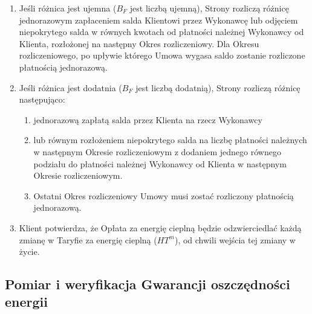 \begin{enumerate}
	\item Jeśli różnica jest ujemna ($B_F$ jest liczbą ujemną), Strony rozliczą różnicę jednorazowym zapłaceniem salda Klientowi przez Wykonawcę lub odjęciem niepokrytego salda w równych kwotach od płatności należnej Wykonawcy od Klienta, rozłożonej na następny Okres rozliczeniowy. Dla Okresu rozliczeniowego, po upływie którego Umowa wygasa saldo zostanie rozliczone płatnością jednorazową.

	\item Jeśli różnica jest dodatnia ($B_F$ jest liczbą dodatnią), Strony rozliczą różnicę następująco:
	\begin{enumerate}
		\item jednorazową zapłatą salda przez Klienta na rzecz Wykonawcy
		\item lub równym rozłożeniem niepokrytego salda na liczbę płatności należnych w następnym Okresie rozliczeniowym z dodaniem jednego równego podziału do płatności należnej Wykonawcy od Klienta w następnym Okresie rozliczeniowym.
		\item Ostatni Okres rozliczeniowy Umowy musi zostać rozliczony płatnością jednorazową.
	\end{enumerate}

	\item Klient potwierdza, że Opłata za energię cieplną będzie odzwierciedlać każdą zmianę w Taryfie za energię cieplną ($HT^m$), od chwili wejścia tej zmiany w życie.
\end{enumerate}

\subsection{Pomiar i weryfikacja Gwarancji oszczędności energii}


